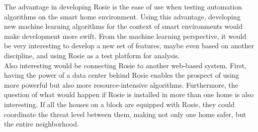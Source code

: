 The advantage in developing Rosie is the ease of use when testing automation algorithms on the smart home environment. Using this advantage, developing new machine learning algorithms for the context of smart environments would make development more swift.
From the machine learning perspective, it would be very interesting to develop a new set of features, maybe even based on another discipline, and using Rosie as a test platform for analysis. \\
Also interesting would be connecting Rosie to another web-based system. First, having the power of a data center behind Rosie enables the prospect of using more powerful but also more resource-intensive algorithms. Furthermore, the question of what would happen if Rosie is installed in more than one home is also interesting. If all the houses on a block are equipped with Rosie, they could coordinate the threat level between them, making not only one home safer, but the entire neighborhood.

